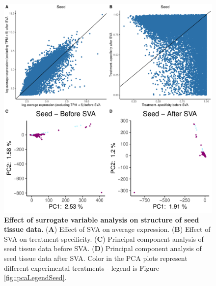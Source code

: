 \documentclass[12pt]{article}
\begin{document}
\begin{figure}[H]
\centering
\includegraphics[width = \linewidth]{figures/appendix_a/pca_beforeAndAfterSva_seed_2023-02-21.pdf}
\caption{\textbf{Effect of surrogate variable analysis on structure of seed tissue data.} (\textbf{A}) Effect of SVA on average expression. (\textbf{B}) Effect of SVA on treatment-specificity. (\textbf{C}) Principal component analysis of seed tissue data before SVA. (\textbf{D}) Principal component analysis of seed tissue data after SVA. Color in the PCA plots represent different experimental treatments - legend is Figure \ref{fig::pcaLegendSeed}.}%
\end{figure}
\end{document}
